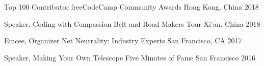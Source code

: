 



\begin{cvhonors}

  \cvhonor
    {Top 100 Contributor} %
    {freeCodeCamp Community Awards} %
    {Hong Kong, China} %
    {2018} %
    
  \cvhonor
    {Speaker, Coding with Compassion} %
    {Belt and Road Makers Tour} %
    {Xi'an, China} %
    {2018} %
    
\end{cvhonors}




\begin{cvhonors}

  \cvhonor
    {Emcee, Organizer} %
    {Net Neutrality: Industry Experts} %
    {San Francisco, CA} %
    {2017} %

  \cvhonor
    {Speaker, Making Your Own Telescope} %
    {Five Minutes of Fame} %
    {San Francisco} %
    {2016} %

\end{cvhonors}
